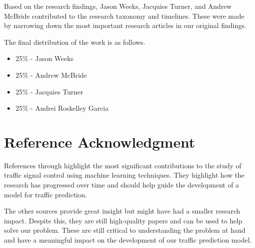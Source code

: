 \documentclass[conference]{IEEEtran}
\begin{document}
Based on the research findings, Jason Weeks, Jacquies Turner, and Andrew McBride contributed to the research taxonomy and timelines. These were made by narrowing down the most important research articles in our original findings.  

The final distribution of the work is as follows. 

\begin{itemize}
    \item 25\% - Jason Weeks
    \item 25\% - Andrew McBride
    \item 25\% - Jacquies Turner
    \item 25\% - Andrei Roskelley Garcia
\end{itemize}

\section*{Reference Acknowledgment}
References \cite{1} through \cite{15} highlight the most significant contributions to the study of traffic signal control using machine learning techniques. They highlight how the research has progressed over time and should help guide the development of a model for traffic prediction. 

The other sources provide great insight but might have had a smaller research impact. Despite this, they are still high-quality papers and can be used to help solve our problem. These are still critical to understanding the problem at hand and have a meaningful impact on the development of our traffic prediction model. 
\end{document}

